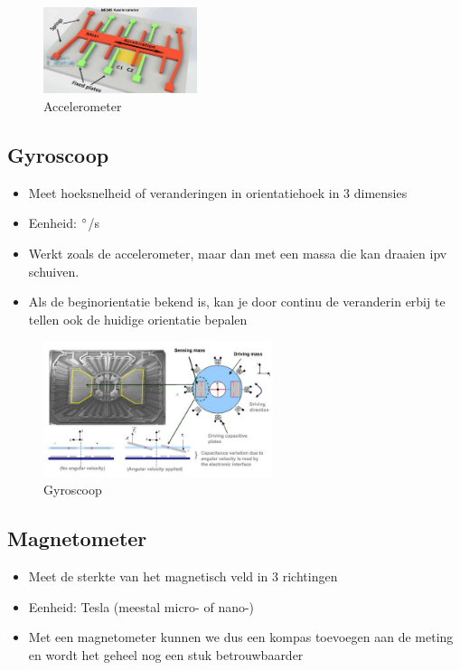 \documentclass{article}
\begin{document}
\begin{figure}[H]
    \centering
    \includegraphics[width=0.4\textwidth]{accelerometer.png}
    \caption{Accelerometer}
\end{figure}


\subsection{Gyroscoop}
\begin{itemize}
    \item Meet hoeksnelheid of veranderingen in orientatiehoek in 3 dimensies
    \item Eenheid: $\degree$/s
    \item Werkt zoals de accelerometer, maar dan met een massa die kan draaien ipv schuiven.
    \item Als de beginorientatie bekend is, kan je door continu de veranderin erbij te tellen ook de huidige orientatie bepalen
\end{itemize}

\begin{figure}[H]
    \centering
    \includegraphics[width=0.6\textwidth]{gyroscope.png}
    \caption{Gyroscoop}
\end{figure}


\subsection{Magnetometer}
\begin{itemize}
    \item Meet de sterkte van het magnetisch veld in 3 richtingen
    \item Eenheid: Tesla (meestal micro- of nano-)
    \item Met een magnetometer kunnen we dus een kompas toevoegen aan de meting en wordt het geheel nog een stuk betrouwbaarder
\end{itemize}
\end{document}
